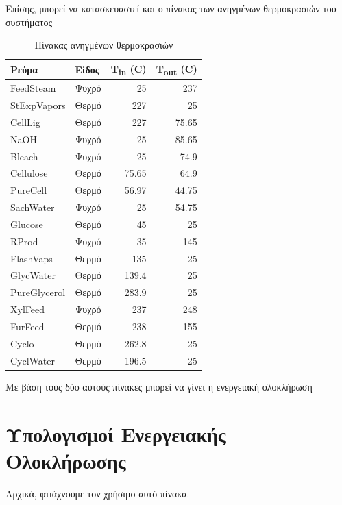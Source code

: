 \documentclass[11pt]{article}
\begin{document}
Επίσης, μπορεί να κατασκευαστεί και ο πίνακας των ανηγμένων θερμοκρασιών του συστήματος
\begin{table}[htbp]
\caption{Πίνακας ανηγμένων θερμοκρασιών}
\centering
\begin{tabular}{llrr}
Ρεύμα & Είδος & Τ\textsubscript{in} (C) & T\textsubscript{out} (C)\\
\hline
FeedSteam & Ψυχρό & 25 & 237\\
StExpVapors & Θερμό & 227 & 25\\
CellLig & Θερμό & 227 & 75.65\\
NaOH & Ψυχρό & 25 & 85.65\\
Bleach & Ψυχρό & 25 & 74.9\\
Cellulose & Θερμό & 75.65 & 64.9\\
PureCell & Θερμό & 56.97 & 44.75\\
SachWater & Ψυχρό & 25 & 54.75\\
Glucose & Θερμό & 45 & 25\\
RProd & Ψυχρό & 35 & 145\\
FlashVaps & Θερμό & 135 & 25\\
GlycWater & Θερμό & 139.4 & 25\\
PureGlycerol & Θερμό & 283.9 & 25\\
XylFeed & Ψυχρό & 237 & 248\\
FurFeed & Θερμό & 238 & 155\\
Cyclo & Θερμό & 262.8 & 25\\
CyclWater & Θερμό & 196.5 & 25\\
\end{tabular}
\end{table}

Με βάση τους δύο αυτούς πίνακες μπορεί να γίνει η ενεργειακή ολοκλήρωση

\section{Υπολογισμοί Ενεργειακής Ολοκλήρωσης}
\label{sec:orgf015b21}
Αρχικά, φτιάχνουμε τον χρήσιμο αυτό πίνακα.
\end{document}
